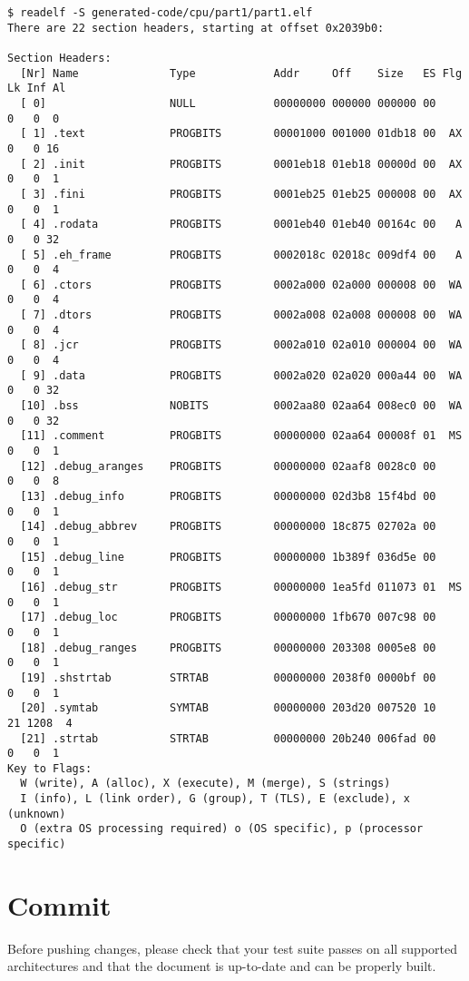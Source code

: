 \documentclass[oneside]{article}
\begin{document}
{
  \normalsize
  \begin{verbatim}
$ readelf -S generated-code/cpu/part1/part1.elf
There are 22 section headers, starting at offset 0x2039b0:

Section Headers:
  [Nr] Name              Type            Addr     Off    Size   ES Flg Lk Inf Al
  [ 0]                   NULL            00000000 000000 000000 00      0   0  0
  [ 1] .text             PROGBITS        00001000 001000 01db18 00  AX  0   0 16
  [ 2] .init             PROGBITS        0001eb18 01eb18 00000d 00  AX  0   0  1
  [ 3] .fini             PROGBITS        0001eb25 01eb25 000008 00  AX  0   0  1
  [ 4] .rodata           PROGBITS        0001eb40 01eb40 00164c 00   A  0   0 32
  [ 5] .eh_frame         PROGBITS        0002018c 02018c 009df4 00   A  0   0  4
  [ 6] .ctors            PROGBITS        0002a000 02a000 000008 00  WA  0   0  4
  [ 7] .dtors            PROGBITS        0002a008 02a008 000008 00  WA  0   0  4
  [ 8] .jcr              PROGBITS        0002a010 02a010 000004 00  WA  0   0  4
  [ 9] .data             PROGBITS        0002a020 02a020 000a44 00  WA  0   0 32
  [10] .bss              NOBITS          0002aa80 02aa64 008ec0 00  WA  0   0 32
  [11] .comment          PROGBITS        00000000 02aa64 00008f 01  MS  0   0  1
  [12] .debug_aranges    PROGBITS        00000000 02aaf8 0028c0 00      0   0  8
  [13] .debug_info       PROGBITS        00000000 02d3b8 15f4bd 00      0   0  1
  [14] .debug_abbrev     PROGBITS        00000000 18c875 02702a 00      0   0  1
  [15] .debug_line       PROGBITS        00000000 1b389f 036d5e 00      0   0  1
  [16] .debug_str        PROGBITS        00000000 1ea5fd 011073 01  MS  0   0  1
  [17] .debug_loc        PROGBITS        00000000 1fb670 007c98 00      0   0  1
  [18] .debug_ranges     PROGBITS        00000000 203308 0005e8 00      0   0  1
  [19] .shstrtab         STRTAB          00000000 2038f0 0000bf 00      0   0  1
  [20] .symtab           SYMTAB          00000000 203d20 007520 10     21 1208  4
  [21] .strtab           STRTAB          00000000 20b240 006fad 00      0   0  1
Key to Flags:
  W (write), A (alloc), X (execute), M (merge), S (strings)
  I (info), L (link order), G (group), T (TLS), E (exclude), x (unknown)
  O (extra OS processing required) o (OS specific), p (processor specific)

  \end{verbatim}
}




\section{Commit}
Before pushing changes, please check that your test suite passes on all supported
architectures and that the document is up-to-date and can be properly built.
\end{document}
